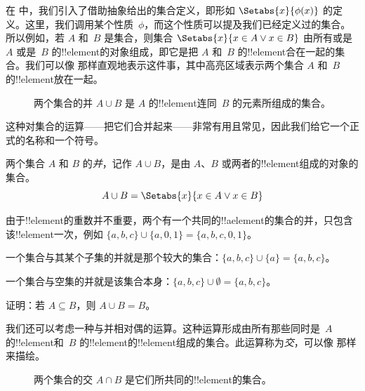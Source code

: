 \documentclass[../../../include/open-logic-section]{subfiles}
\begin{document}

\begin{explain}
在  中，我们引入了借助抽象给出的集合定义，即形如 $\Setabs{x}{\phi(x)}$ 的定义。这里，我们调用某个性质~$\phi$，而这个性质可以提及我们已经定义过的集合。所以例如，若 $A$ 和~$B$ 是集合，则集合 $\Setabs{x}{x \in A \lor x \in B}$ 由所有或是 $A$ 或是~$B$ 的!!{element}的对象组成，即它是把 $A$ 和~$B$ 的!!{element}合在一起的集合。我们可以像  那样直观地表示这件事，其中高亮区域表示两个集合 $A$ 和~$B$ 的!!{element}放在一起。

\begin{figure}
  \caption{两个集合的并 $A \cup B$ 是 $A$ 的!!{element}连同~$B$ 的元素所组成的集合。}
\end{figure}

这种对集合的运算——把它们合并起来——非常有用且常见，因此我们给它一个正式的名称和一个符号。
\end{explain}

\begin{defn}[并]
两个集合 $A$ 和 $B$ 的\emph{并}，记作 $A \cup B$，是由 $A$、$B$ 或两者的!!{element}组成的对象的集合。
\[
A \cup B = \Setabs{x}{x \in A \lor x \in B}
\]
\end{defn}

\begin{ex}
由于!!{element}的重数并不重要，两个有一个共同的!!a{element}的集合的并，只包含该!!{element}一次，例如 $\{ a, b, c\} \cup \{ a, 0, 1\} = \{a, b, c, 0, 1\}$。

一个集合与其某个子集的并就是那个较大的集合：$\{a,
b, c \} \cup \{a \} = \{a, b, c\}$。

一个集合与空集的并就是该集合本身：$\{a,
b, c \} \cup \emptyset = \{a, b, c \}$。
\end{ex}

\begin{prob}
证明：若 $A \subseteq B$，则 $A \cup B = B$。
\end{prob}

\begin{explain}
我们还可以考虑一种与并相对偶的运算。这种运算形成由所有那些同时是~$A$ 的!!{element}和~$B$ 的!!{element}的!!{element}组成的集合。此运算称为\emph{交}，可以像  那样来描绘。
\begin{figure}
  \caption{两个集合的交 $A \cap B$ 是它们所共同的!!{element}的集合。}
\end{figure}
\end{explain}
\end{document}
